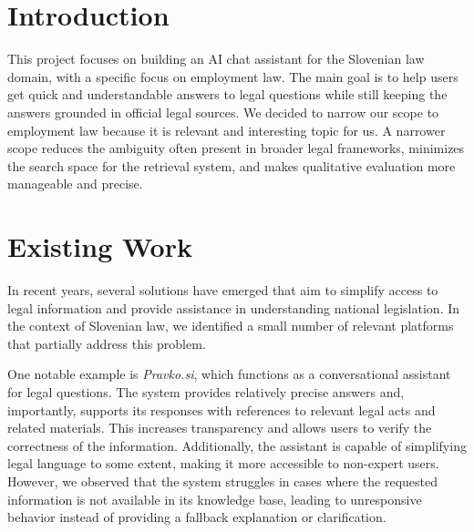 \documentclass[fleqn,moreauthors,10pt]{ds_report}
\affiliation{\textit{Advisors: Slavko Žitnik, Aleš Žagar}}
\begin{document}
\flushbottom 

\maketitle 

\thispagestyle{empty} 


\section*{Introduction}
	This project focuses on building an AI chat assistant for the Slovenian law domain, with a specific focus on employment law. The main goal is
	to help users get quick and understandable answers to legal questions while still keeping the answers
	grounded in official legal sources. We decided to narrow our scope to employment law because it is relevant and interesting topic for us.
	A narrower scope reduces the ambiguity often present in broader legal frameworks, minimizes the search space for the retrieval system,
	and makes qualitative evaluation more manageable and precise.


\section*{Existing Work}

In recent years, several solutions have emerged that aim to simplify access to legal information
and provide assistance in understanding national legislation. In the context of Slovenian law,
we identified a small number of relevant platforms that partially address this problem.

One notable example is \textit{Pravko.si}, which functions as a conversational assistant
for legal questions. \cite{Pravko.si} The system provides relatively precise answers and, importantly,
supports its responses with references to relevant legal acts and related materials.
This increases transparency and allows users to verify the correctness of the information.
Additionally, the assistant is capable of simplifying legal language to some extent,
making it more accessible to non-expert users. However, we observed that the system struggles
in cases where the requested information is not available in its knowledge base,
leading to unresponsive behavior instead of providing a fallback explanation or clarification.
\end{document}

